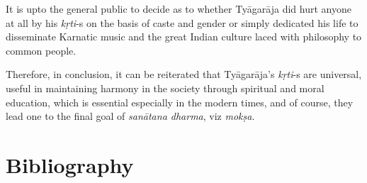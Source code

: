 It is upto the general public to decide as to whether Tyāgarāja did hurt anyone at all by his \textit{kṛti}-s on the basis of caste and gender or simply dedicated his life to disseminate Karnatic music and the great Indian culture laced with philosophy to common people.

Therefore, in conclusion, it can be reiterated that Tyāgarāja’s \textit{kṛti}-s are universal, useful in maintaining harmony in the society through spiritual and moral education, which is essential especially in the modern times, and of course, they lead one to the final goal of \textit{sanātana dharma}, viz \textit{mokṣa}.


\vspace{-.3cm}

\section*{Bibliography}

